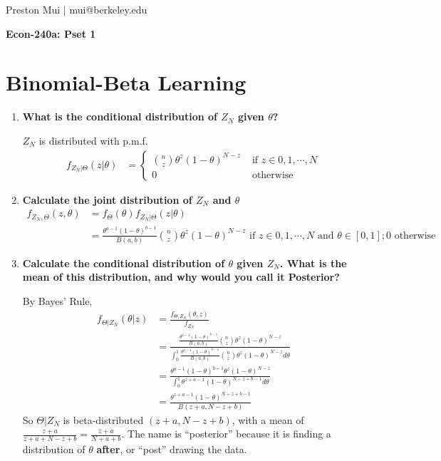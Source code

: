 \documentclass{article}[12pt]
\begin{document}
\begin{center}
	Preston Mui | mui@berkeley.edu

	{\bf Econ-240a: Pset 1}
\end{center}


\setcounter{section}{1}
\section{Binomial-Beta Learning}
	\begin{enumerate}
		\item \textbf{What is the conditional distribution of $Z_N$ given $\theta$?}
		
		$Z_N$ is distributed with p.m.f.
		\begin{align*}
		    f_{Z_N | \Theta}(z | \theta) &= \begin{cases}
		    \binom{n}{z} \theta^z (1-\theta)^{N - z} &\mbox{ if $z \in 0, 1, \cdots, N$} \\
		    0 &\mbox{ otherwise}
		    \end{cases}
		\end{align*}

	\item \textbf{Calculate the joint distribution of $Z_N$ and $\theta$}
	\begin{align*}
	    f_{Z_N,\Theta}(z,\theta) &= f_{\Theta}(\theta) f_{Z_N | \Theta}(z|\theta) \\
	    &= \frac{\theta^{a-1}(1-\theta)^{b-1}}{B(a,b)} \binom{n}{z} \theta^z (1-\theta)^{N - z} \mbox{ if $z \in 0, 1, \cdots, N$ and $\theta \in [0,1]$}; 0 \mbox{ otherwise} 
	\end{align*}

	\item \textbf{Calculate the conditional distribution of $\theta$ given $Z_N$. What is the mean of this distribution, and why would you call it Posterior?}

	By Bayes' Rule,
	\begin{align*}
	    f_{\Theta | Z_N}(\theta | z) &= \frac{f_{\Theta, Z_N}(\theta,z)}{f_{Z_N}}\\
	    &= \frac{\frac{\theta^{a-1}(1-\theta)^{b-1}}{B(a,b)} \binom{n}{z} \theta^z (1-\theta)^{N - z}}{\int_{0}^{1} \frac{\theta^{a-1}(1-\theta)^{b-1}}{B(a,b)} \binom{n}{z} \theta^z (1-\theta)^{N - z} d\theta}\\
	    &= \frac{\theta^{a-1}(1-\theta)^{b-1} \theta^z (1-\theta)^{N - z}}{\int_{0}^{1} \theta^{z+a-1}(1-\theta)^{N-z+b-1} d\theta} \\
	    &= \frac{\theta^{z+a-1}(1-\theta)^{N-z+b-1}}{B(z+a,N-z+b)}
	\end{align*}
	So $\Theta | Z_N$ is beta-distributed $(z+a,N-z+b)$, with a mean of $\frac{z+a}{z+a+N-z+b} = \frac{z+a}{N+a+b}$. The name is ``posterior'' because it is finding a distribution of $\theta$ \textbf{after}, or ``post'' drawing the data.


\end{enumerate}
\end{document}
